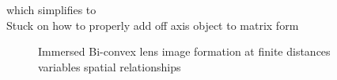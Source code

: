 \documentclass[main.tex]{subfiles}
\begin{document}
which simplifies to\\

Stuck on how to properly add off axis object to matrix form\\

\begin{figure}
\centering{}
\caption{Immersed Bi-convex lens image formation at finite distances variables spatial relationships}
\label{fig:5d}
\end{figure}
\end{document}

